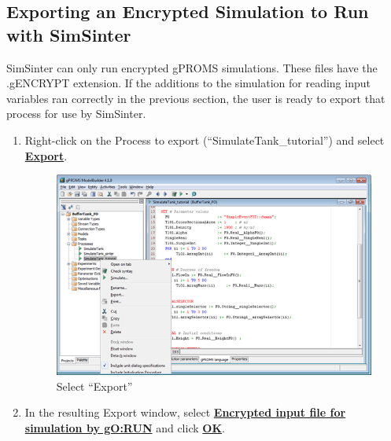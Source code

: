 \begin{enumerate}
\end{enumerate}

\subsection{Exporting an Encrypted Simulation to Run with SimSinter}

SimSinter can only run encrypted gPROMS simulations.  These files have the .gENCRYPT extension.  If the additions to the simulation for reading input variables ran correctly in the previous section, the user is ready to export that process for use by SimSinter.

\begin{enumerate}

\item Right-click on the Process to export (``SimulateTank\_tutorial'') and select \textbf{\underline{Export}}.

\begin{figure}[H]
	\begin{center}
		\includegraphics[scale=0.55]{Chapt_sinter/figs/gPROMS/11_Export}
		\caption{Select ``Export''}
		\label{fig.sinter.gproms.selectexport}
	\end{center}
\end{figure}

\item In the resulting Export window, select \textbf{\underline{Encrypted input file for simulation by gO:RUN}} and click \textbf{\underline{OK}}.


\end{enumerate}

